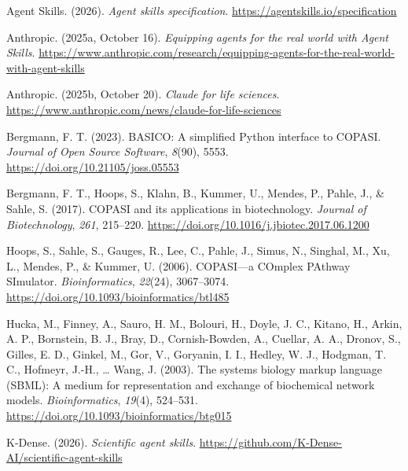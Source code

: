 \documentclass[10pt,a4paper,onecolumn]{article}
\newlength{\cslhangindent}
\newenvironment{CSLReferences}[2] %
   {\begin{list}{}{%
    \setlength{\itemindent}{0pt}
    \setlength{\leftmargin}{0pt}
    \setlength{\parsep}{0pt}
    \ifodd #1
     \setlength{\leftmargin}{\cslhangindent}
     \setlength{\itemindent}{-1\cslhangindent}
    \fi
    \setlength{\itemsep}{#2\baselineskip}}}
   {\end{list}}
\begin{document}
  \protect{}\label{refs}
  \begin{CSLReferences}{1}{0.5}
  Agent Skills. (2026). \emph{Agent skills specification}.
  \url{https://agentskills.io/specification}

  Anthropic. (2025a, October 16). \emph{Equipping agents for the real
  world with {Agent Skills}}.
  \url{https://www.anthropic.com/research/equipping-agents-for-the-real-world-with-agent-skills}

  Anthropic. (2025b, October 20). \emph{Claude for life sciences}.
  \url{https://www.anthropic.com/news/claude-for-life-sciences}

  Bergmann, F. T. (2023). {BASICO}: A simplified {Python} interface to
  {COPASI}. \emph{Journal of Open Source Software}, \emph{8}(90), 5553.
  \url{https://doi.org/10.21105/joss.05553}

  Bergmann, F. T., Hoops, S., Klahn, B., Kummer, U., Mendes, P., Pahle,
  J., \& Sahle, S. (2017). {COPASI} and its applications in biotechnology.
  \emph{Journal of Biotechnology}, \emph{261}, 215–220.
  \url{https://doi.org/10.1016/j.jbiotec.2017.06.1200}

  Hoops, S., Sahle, S., Gauges, R., Lee, C., Pahle, J., Simus, N.,
  Singhal, M., Xu, L., Mendes, P., \& Kummer, U. (2006). {COPASI}—a
  {CO}mplex {PA}thway {SI}mulator. \emph{Bioinformatics}, \emph{22}(24),
  3067–3074. \url{https://doi.org/10.1093/bioinformatics/btl485}

  Hucka, M., Finney, A., Sauro, H. M., Bolouri, H., Doyle, J. C., Kitano,
  H., Arkin, A. P., Bornstein, B. J., Bray, D., Cornish-Bowden, A.,
  Cuellar, A. A., Dronov, S., Gilles, E. D., Ginkel, M., Gor, V.,
  Goryanin, I. I., Hedley, W. J., Hodgman, T. C., Hofmeyr, J.-H., … Wang,
  J. (2003). The systems biology markup language ({SBML}): A medium for
  representation and exchange of biochemical network models.
  \emph{Bioinformatics}, \emph{19}(4), 524–531.
  \url{https://doi.org/10.1093/bioinformatics/btg015}

  K-Dense. (2026). \emph{Scientific agent skills}.
  \url{https://github.com/K-Dense-AI/scientific-agent-skills}

  \end{CSLReferences}


  
\end{document}
